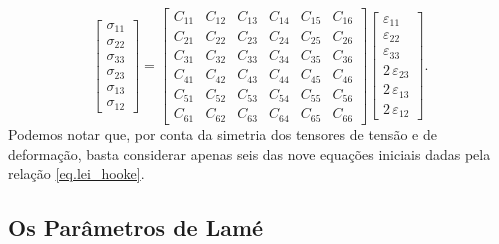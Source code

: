 \begin{equation*}
\begin{bmatrix}
\sigma_{11}\\
\sigma_{22}\\
\sigma_{33}\\
\sigma_{23}\\
\sigma_{13}\\
\sigma_{12}
\end{bmatrix}=
\begin{bmatrix}
C_{11}&C_{12}&C_{13}&C_{14}&C_{15}&C_{16}\\
C_{21}&C_{22}&C_{23}&C_{24}&C_{25}&C_{26}\\
C_{31}&C_{32}&C_{33}&C_{34}&C_{35}&C_{36}\\
C_{41}&C_{42}&C_{43}&C_{44}&C_{45}&C_{46}\\
C_{51}&C_{52}&C_{53}&C_{54}&C_{55}&C_{56}\\
C_{61}&C_{62}&C_{63}&C_{64}&C_{65}&C_{66}
\end{bmatrix}
\begin{bmatrix}
\varepsilon_{11}\\
\varepsilon_{22}\\
\varepsilon_{33}\\
2\,\varepsilon_{23}\\
2\,\varepsilon_{13}\\
2\,\varepsilon_{12}
\end{bmatrix}.
\end{equation*}
Podemos notar que, por conta da simetria dos tensores de tens\~ao e de deforma\c{c}\~ao, basta considerar apenas seis das nove equa\c{c}\~oes iniciais dadas pela rela\c{c}\~ao \ref{eq.lei_hooke}.

\subsection{Os Par\^ametros de Lam\'e}

